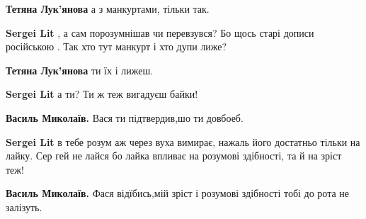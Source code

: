 \begin{itemize}
\begin{itemize}
\textbf{Тетяна Лук'янова} а з манкуртами, тільки так.

 
\textbf{Sergei Lit} , а сам порозумнішав чи перевзувся? Бо щось старі дописи російською . Так хто тут манкурт і хто дупи лиже?

 
\textbf{Тетяна Лук'янова} ти їх і лижеш.

 
\textbf{Sergei Lit} а ти? Ти ж теж вигадуєш байки!

 
\textbf{Василь Миколаїв.} Вася ти підтвердив,шо ти довбоеб.

 
\textbf{Sergei Lit} в тебе розум аж через вуха вимирає, нажаль його достатньо тільки на лайку. Сер гей не лайся бо лайка впливає на розумові здібності, та й на зріст теж!

 
\textbf{Василь Миколаїв.} Фася відїбись,мій зріст і розумові здібності тобі до рота не залізуть.


\end{itemize}
\end{itemize}
